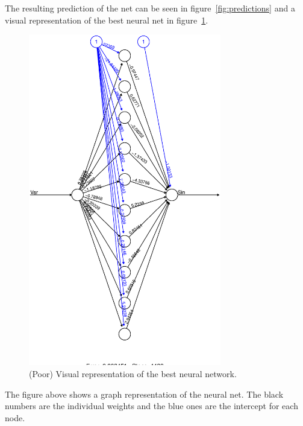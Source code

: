 \documentclass[a4paper, 12p]{article}
\begin{document}
    The resulting prediction of the net can be seen in figure~\ref{fig:predictions} and a visual representation of the best neural net in figure~\ref{fig:network}.

    \begin{figure}[H]
        \centering
        \caption{(Poor) Visual representation of the best neural network.}
        \label{fig:network}
        \includegraphics[width=0.75\textwidth]{share/network.eps}
    \end{figure}
    The figure above shows a graph representation of the neural net. The black numbers are the individual weights and the blue ones are the intercept for each node.
\end{document}
